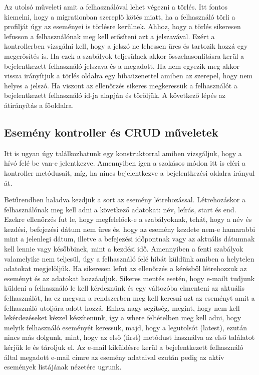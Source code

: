 \documentclass[
]{thesis-ekf}
\theoremstyle{definition}
\theoremstyle{remark}
\begin{document}
Az utolsó műveleti amit a felhasználóval lehet végezni a törlés. Itt fontos kiemelni, hogy a migrationban szereplő kötés miatt, ha a felhasználó törli a profilját úgy az eseményei is törlésre kerülnek. Ahhoz, hogy a törlés sikeresen lefusson a felhasználónak meg kell erősíteni azt a jelszavával. Ezért a kontrollerben vizsgálni kell, hogy a jelszó ne lehessen üres és tartozik hozzá egy megerősítés is. Ha ezek a szabályok teljesülnek akkor összehasonlításra kerül a bejelentkezett felhasználó jelszava és a megadott. Ha nem egyezik meg akkor vissza irányítjuk a törlés oldalra egy hibaüzenettel amiben az szerepel, hogy nem helyes a jelszó. Ha viszont az ellenőrzés sikeres megkeressük a felhasználót a bejelentkezett felhasználó id-ja alapján és töröljük. A következő lépés az átirányítás a főoldalra.

\subsection{Esemény kontroller és CRUD műveletek}
Itt is ugyan úgy találkozhatunk egy konstruktorral amiben vizsgáljuk, hogy a hívó felé be van-e jelentkezve. Amennyiben igen a szokásos módon itt is eléri a kontroller metódusait, míg, ha nincs bejelentkezve a bejelentkezési oldalra irányul át.

Betűrendben haladva kezdjük a sort az esemény létrehozással. Létrehozáskor a felhasználónak meg kell adni a következő adatokat: név, leírás, start és end. Ezekre ellenőrzés fut le, hogy megfelelőek-e a szabályoknak, tehát, hogy a név és kezdési, befejezési dátum nem üres és, hogy az esemény kezdete nem-e hamarabbi mint a jelenlegi dátum, illetve a befejezési időpontnak vagy az aktuális dátumnak kell lennie vagy későbbinek, mint a kezdési idő. Amennyiben a fenti szabályok valamelyike nem teljesül, úgy a felhasználó felé hibát küldünk amiben a helytelen adatokat megjelöljük. Ha sikeresen lefut az ellenőrzés a kérésből létrehozzuk az eseményt és az adatokat hozzáadjuk. Sikeres mentés esetén, hogy e-mailt tudjunk küldeni a felhasználó le kell kérdeznünk és egy változóba elmenteni az aktuális felhasználót, ha ez megvan a rendszerben meg kell keresni azt az eseményt amit a felhasználó utoljára adott hozzá. Ehhez nagy segítség, megint, hogy nem kell lekérdezéseket kézzel készítenünk, így a where feltételben meg kell adni, hogy melyik felhasználó eseményét keressük, majd, hogy a legutolsót (latest), ezután nincs más dolgunk, mint, hogy az első (first) metódust használva az első találatot kérjük le és tároljuk el. Az e-mail kiküldésre kerül a bejelentkezett felhasználó által megadott e-mail címre az esemény adataival ezután pedig az aktív események listájának nézetére ugrunk.
\end{document}
